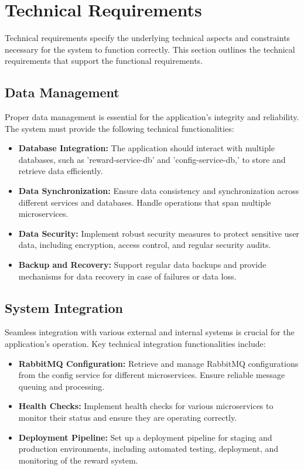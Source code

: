 \section{Technical Requirements}
Technical requirements specify the underlying technical aspects and constraints necessary for the system to function correctly. This section outlines the technical requirements that support the functional requirements.

\subsection{Data Management}
Proper data management is essential for the application's integrity and reliability. The system must provide the following technical functionalities:

\begin{itemize}
    \item \textbf{Database Integration:} The application should interact with multiple databases, such as 'reward-service-db' and 'config-service-db,' to store and retrieve data efficiently.
    \item \textbf{Data Synchronization:} Ensure data consistency and synchronization across different services and databases. Handle operations that span multiple microservices.
    \item \textbf{Data Security:} Implement robust security measures to protect sensitive user data, including encryption, access control, and regular security audits.
    \item \textbf{Backup and Recovery:} Support regular data backups and provide mechanisms for data recovery in case of failures or data loss.
\end{itemize}

\subsection{System Integration}
Seamless integration with various external and internal systems is crucial for the application's operation. Key technical integration functionalities include:

\begin{itemize}
    \item \textbf{RabbitMQ Configuration:} Retrieve and manage RabbitMQ configurations from the config service for different microservices. Ensure reliable message queuing and processing.
    \item \textbf{Health Checks:} Implement health checks for various microservices to monitor their status and ensure they are operating correctly.
    \item \textbf{Deployment Pipeline:} Set up a deployment pipeline for staging and production environments, including automated testing, deployment, and monitoring of the reward system.
\end{itemize}

